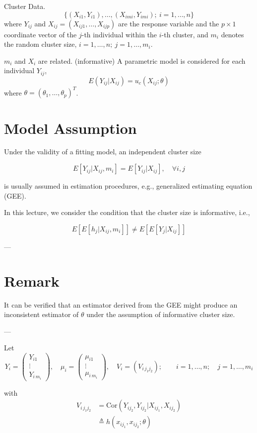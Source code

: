 \documentclass[UTF8,a4paper,10pt]{article}
\begin{document}
Cluster Data.
\[
\{(X_{i1}, Y_{i1}), \ldots, (X_{imi}, Y_{imi});\ i = 1, \ldots, n\}
\]
where \(Y_{ij}\) and \(X_{ij} = (X_{ij1}, \ldots, X_{ijp})\) are the response variable and the \(p \times 1\) coordinate vector of the \(j\)-th individual within the \(i\)-th cluster, and \(m_i\) denotes the random cluster size, \(i = 1, \ldots, n;\ j = 1, \ldots, m_i\).

\(m_i\) and \(X_i\) are related. (informative) A parametric model is considered for each individual \(Y_{ij}\),
\[
E(Y_{ij} | X_{ij}) = u_c(X_{ij}; \theta)
\]
where \(\theta = (\theta_1, \ldots, \theta_p)^T\).

\section*{Model Assumption}

Under the validity of a fitting model, an independent cluster size

\[
E[Y_{ij} | X_{ij}, m_i] = E[Y_{ij} | X_{ij}], \quad \forall i,j
\]

is usually assumed in estimation procedures, e.g., generalized estimating equation (GEE).

In this lecture, we consider the condition that the cluster size is informative, i.e.,

\[
E[E[h_j | X_{ij}, m_i]] \neq E[E[Y_j | X_{ij}]]
\]

---

\section*{Remark}

It can be verified that an estimator derived from the GEE might produce an inconsistent estimator of \(\theta\) under the assumption of informative cluster size.

---


Let 
\[Y_i = \begin{pmatrix}
    Y_{i1}\\
    \vdots\\
    Y_{i\,m_i}
\end{pmatrix},\quad \mu_i = \begin{pmatrix}
    \mu_{i1}\\
    \vdots\\
    \mu_{i\,m_i}
\end{pmatrix},\quad V_{i} = (V_{i\,j_1 j_2});\quad \quad i = 1, \ldots, n; \quad j = 1, \ldots, m_i\]

with
\begin{align*}
    V_{i\,j_1 j_2} 
    &= \text{Cor}(Y_{ij_2}, Y_{ij_2} | X_{ij_1}, X_{ij_2})\\
    &\triangleq h(x_{ij_1},x_{ij_2}; \theta)
\end{align*}
\end{document}
